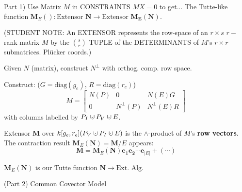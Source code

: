 \documentclass{beamer}
\newcommand{\dunion}
{\mbox{\hbox{\hskip0.45em$\cdot$\hskip-0.44em$\cup$\hskip0.2em}}}
\newcommand{\Remph}[1]{{\color{red}#1}}
\begin{document}
\begin{frame}
{Part 1) Use Matrix $M$ in CONSTRAINTS $MX=0$ to get...}
The Tutte-like function $\mathbf{M}_E():\text{Extensor }
\mathbf{N}\rightarrow\text{Extensor }\mathbf{M_E(N)}$.

{\small
(\Remph{STUDENT NOTE:} An EXTENSOR represents the row-space of an $r\times s$
$r-$rank matrix $M$ by the $\binom{s}{r}$-TUPLE of the DETERMINANTS of 
$M$'s $r\times r$ submatrices. \Remph{Pl\"{u}cker coords}.)
}

Given $N$ (matrix), construct $N^\perp$ 
with orthog. comp. row space.

Construct:  ($G=\mbox{diag}(g_e)$, $R=\mbox{diag}(r_e)$)
\[
M = \left[\begin{array}{c|c|c} N(P)  &  0  &  N(E)G \\  \hline
0  & N^{\perp}(P)  &  N^{\perp}(E)R \end{array}\right]
\]
with columns labelled by $P_I\dunion P_V\dunion E$.

Extensor $\mathbf{M}$ over $k[g_e, r_e](P_V\dunion P_I \dunion E)$
is the \Remph{$\wedge$-product} of $M$'s \textbf{row vectors}. The contraction result
$\mathbf{M}_E(\mathbf{N}) = \mathbf{M}/E$ appears:
\[
\mathbf{M} = \mathbf{M}_E(\mathbf{N})\mathbf{e_1}\mathbf{e_2}\cdots\mathbf{e}_{|E|} + (\cdots) 
\]

\Remph{
$\mathbf{M}_E(\mathbf{N})$ is our Tutte function $\mathbf{N}\rightarrow \text{Ext. Alg.}$}
\end{frame}

\begin{frame}{(Part 2) Common Covector Model}

\end{frame}
\end{document}

